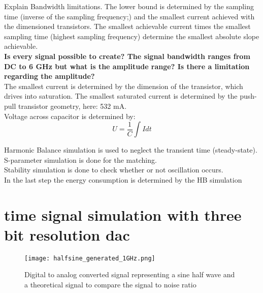 Explain Bandwidth limitations. The lower bound is determined by the sampling time (inverse of the sampling frequency;) and the smallest current achieved with the dimensioned transistors. The smallest achievable current times the smallest sampling time (highest sampling frequency) determine the smallest absolute slope achievable. \\ \textbf{Is every signal possible to create? The signal bandwidth ranges from DC to 6 GHz but what is the amplitude range? Is there a limitation regarding the amplitude?}
\\
The smallest current is determined by the dimension of the transistor, which drives into saturation. The smallest saturated current is determined by the push-pull transistor geometry, here: 532 mA.\\Voltage across capacitor is determined by:
\begin{equation}
U = \frac{1}{C} \int I  dt 
\end{equation}

Harmonic Balance simulation is used to neglect the transient time (steady-state).
\\ S-parameter simulation is done for the matching.\\ Stability simulation is done to check whether or not oscillation occurs. \\ In the last step the energy consumption is determined by the HB simulation\\



\section{time signal simulation with three bit resolution dac}
\begin{figure}[ht]
	\centering
  \texttt{[image: halfsine\_generated\_1GHz.png]}
	\caption{Digital to analog converted signal representing a sine half wave and a theoretical signal to compare the signal to noise ratio}
	\label{halfsine}
\end{figure}

